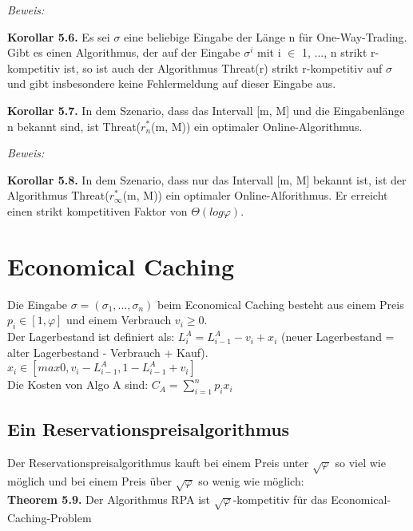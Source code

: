 \textit{Beweis:} 

\textbf{Korollar 5.6.} Es sei $\sigma$ eine beliebige Eingabe der Länge n für One-Way-Trading. Gibt es einen Algorithmus, der auf der Eingabe $\sigma^{i}$ mit i $\in$ {1, ..., n} strikt r-kompetitiv ist, so ist auch der Algorithmus Threat(r) strikt r-kompetitiv auf $\sigma$ und gibt insbesondere keine Fehlermeldung auf dieser Eingabe aus.

\textbf{Korollar 5.7.} In dem Szenario, dass das Intervall [m, M] und die Eingabenlänge n bekannt sind, ist Threat($r_{n}^{*}$(m, M)) ein optimaler Online-Algorithmus.

\textit{Beweis:} 

\textbf{Korollar 5.8.} In dem Szenario, dass nur das Intervall [m, M] bekannt ist, ist der Algorithmus Threat($r_{\infty}^{*}$(m, M)) ein optimaler Online-Alforithmus. Er erreicht einen strikt kompetitiven Faktor von $\Theta(log \varphi)$. 

\section{Economical Caching}

Die Eingabe $\sigma = (\sigma_{1}, ..., \sigma_{n})$ beim Economical Caching besteht aus einem Preis $p_{i} \in [1, \varphi]$ und einem Verbrauch $v_{i} \ge 0$.\\
Der Lagerbestand ist definiert als: $L_{i}^{A} = L_{i-1}^{A} - v_{i} + x_{i}$ (neuer Lagerbestand = alter Lagerbestand - Verbrauch + Kauf).\\
$x_{i} \in [max{0, v_{i}-L_{i-1}^{A}}, 1-L_{i-1}^{A}+v_{i}]$ \\
Die Kosten von Algo A sind: $C_{A} = \sum_{i = 1}^{n} p_{i}x_{i}$

\subsection{Ein Reservationspreisalgorithmus}

Der Reservationspreisalgorithmus kauft bei einem Preis unter $\sqrt{\varphi}$ so viel wie möglich und bei einem Preis über $\sqrt{\varphi}$ so wenig wie möglich: \\


\textbf{Theorem 5.9.} Der Algorithmus RPA ist $\sqrt{\varphi}$-kompetitiv für das Economical-Caching-Problem

